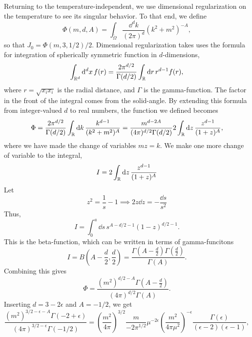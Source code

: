 Returning to the temperature-independent, we use dimensional regularization on the temperature to see its singular behavior.
To that end, we define
\begin{equation}
    \Phi(m, d, A) = \int_{\tilde \Omega} \frac{\dd^d k}{(2 \pi)^d} (k^2 + m^2)^{-A},
\end{equation}
so that $J_0 = \Phi(m, 3, 1/2) / 2$.
Dimensional regularization takes uses the formula for integration of spherically symmetric function in $d$-dimensions,
\begin{equation}
    \int_{\mathbb{R}^d} \dd^d x \, f(r) 
    = \frac{2 \pi^{d/2}}{\Gamma(d/2)} \int_{\mathbb{R}} \dd r \, r^{d-1}f(r),
\end{equation}
where $r = \sqrt{x_i x_i}$ is the radial distance, and $\Gamma$ is the gamma-function.
The factor in the front of the integral comes from the solid-angle.
By extending this formula from integer-valued $d$ to real numbers, the function we defined becomes
\begin{equation}
    \Phi 
    = \frac{2 \pi^{d/2}}{\Gamma(d/2)} \int_{\mathbb{R}} \dd k \, 
    \frac{k^{d-1}}{(k^2 + m^2)^A}
    = \frac{m^{d - 2A}}{(4 \pi)^{d / 2}\Gamma(d/2)} 
    2 \int_{\mathbb{R}} \dd z \, \frac{z^{d - 1}}{(1 + z)^A}, 
\end{equation}
where we have made the change of variables $m z = k$.
We make one more change of variable to the integral,
\begin{equation}
    I = 2 \int_{\mathbb{R}} \dd z \, \frac{z^{d - 1}}{(1 + z)^A}
\end{equation}
Let
\begin{equation}
    z^2 = \frac{1}{s} - 1 \implies 2 z \dd z = - \frac{\dd s}{s^2}
\end{equation}
Thus,
\begin{equation}
    I = \int_0^a \dd s \, s^{A - d/2 - 1} (1 - z)^{d/2 - 1}.
\end{equation}
This is the beta-function, which can be written in terms of gamma-funcitons~\cite{Peskin:IntroQFT}
\begin{equation}
    I = B\left(A - \frac{d}{2}, \frac{d}{2}\right) 
    = \frac{\Gamma\left(A - \frac{d}{2}\right) \Gamma\left(\frac{d}{2}\right)}{\Gamma(A)}.
\end{equation}
Combining this gives
\begin{equation}
    \Phi = 
    \frac{
        (m^2)^{d/2 - A} \Gamma \left(A - \frac{d}{2} \right) 
    }
    {
        (4 \pi)^{d / 2}\Gamma(A)
    }.
\end{equation}
Inserting $d = 3 - 2\epsilon$ and $A = -1/2$, we get
\begin{equation}
    \frac{
        (m^2)^{3/2 - \epsilon - A} \Gamma \left(-2 + \epsilon \right) 
    }
    {
        (4 \pi)^{3/2 - \epsilon}\Gamma(-1/2)
    }
    = 
    \left(\frac{m^2}{4 \pi}\right)^{3/2} 
    \frac{m}{- 2 \pi^{1/2}}
    \mu^{-2\epsilon}
    \left(\frac{m^2}{4 \pi \mu^2}\right)^{- \epsilon}
    \frac{\Gamma(\epsilon)}{(\epsilon - 2)(\epsilon - 1)},
\end{equation}
